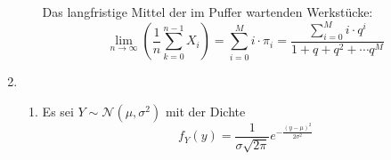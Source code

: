 \documentclass[a4paper]{scrartcl}
\def \blattnr {5}
\begin{document}
\begin{enumerate}[label=\bfseries \blattnr.\arabic*]
\begin{enumerate}
            Das langfristige Mittel der im Puffer wartenden Werkstücke:
            \begin{equation*}
                \lim_{n \to \infty} \left( \frac{1}{n} \sum_{k=0}^{n-1} X_i \right)
                = \sum_{i=0}^M i \cdot \pi_i
                = \frac{\sum_{i=0}^M i \cdot q^i}{1 + q + q^2 + \dotsb q^M}
            \end{equation*}

        \end{enumerate}
   
    \item
        \begin{enumerate}
            \item
	      Es sei $Y \sim \mathcal{N}(\mu, \sigma^2)$ mit der Dichte
	      \begin{equation*}
		  f_Y(y) = \frac1{\sigma\sqrt{2\pi}} e^{-\frac{(y-\mu)^2}{2\sigma^2}}
	      \end{equation*}
	      

\end{enumerate}
\end{enumerate}
\end{document}
